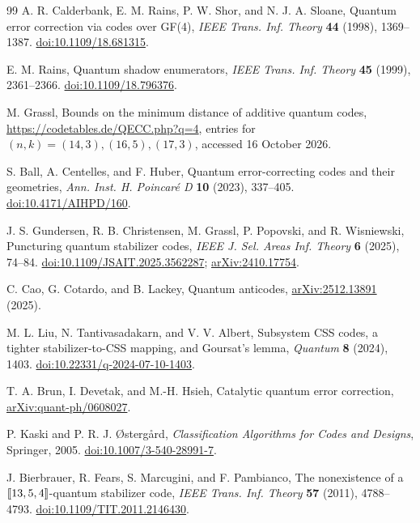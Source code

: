 \begin{thebibliography}{99}
A. R. Calderbank, E. M. Rains, P. W. Shor, and N. J. A. Sloane,
Quantum error correction via codes over GF(4),
\emph{IEEE Trans. Inf. Theory} \textbf{44} (1998), 1369--1387.
\href{https://doi.org/10.1109/18.681315}{doi:10.1109/18.681315}.

E. M. Rains, Quantum shadow enumerators,
\emph{IEEE Trans. Inf. Theory} \textbf{45} (1999), 2361--2366.
\href{https://doi.org/10.1109/18.796376}{doi:10.1109/18.796376}.

M. Grassl, Bounds on the minimum distance of additive quantum codes,
\url{https://codetables.de/QECC.php?q=4}, entries for
\((n,k)=(14,3),(16,5),(17,3)\), accessed 16 October 2026.

S. Ball, A. Centelles, and F. Huber,
Quantum error-correcting codes and their geometries,
\emph{Ann. Inst. H. Poincar\'e D} \textbf{10} (2023), 337--405.
\href{https://doi.org/10.4171/AIHPD/160}{doi:10.4171/AIHPD/160}.

J. S. Gundersen, R. B. Christensen, M. Grassl, P. Popovski, and
R. Wisniewski, Puncturing quantum stabilizer codes,
\emph{IEEE J. Sel. Areas Inf. Theory} \textbf{6} (2025), 74--84.
\href{https://doi.org/10.1109/JSAIT.2025.3562287}{doi:10.1109/JSAIT.2025.3562287};
\href{https://arxiv.org/abs/2410.17754}{arXiv:2410.17754}.

C. Cao, G. Cotardo, and B. Lackey, Quantum anticodes,
\href{https://arxiv.org/abs/2512.13891}{arXiv:2512.13891} (2025).

M. L. Liu, N. Tantivasadakarn, and V. V. Albert,
Subsystem CSS codes, a tighter stabilizer-to-CSS mapping, and Goursat's lemma,
\emph{Quantum} \textbf{8} (2024), 1403.
\href{https://doi.org/10.22331/q-2024-07-10-1403}{doi:10.22331/q-2024-07-10-1403}.

T. A. Brun, I. Devetak, and M.-H. Hsieh,
Catalytic quantum error correction,
\href{https://arxiv.org/abs/quant-ph/0608027}{arXiv:quant-ph/0608027}.

P. Kaski and P. R. J. \O{}sterg{\aa}rd,
\emph{Classification Algorithms for Codes and Designs},
Springer, 2005.
\href{https://doi.org/10.1007/3-540-28991-7}{doi:10.1007/3-540-28991-7}.

J. Bierbrauer, R. Fears, S. Marcugini, and F. Pambianco,
The nonexistence of a \([\![13,5,4]\!]\)-quantum stabilizer code,
\emph{IEEE Trans. Inf. Theory} \textbf{57} (2011), 4788--4793.
\href{https://doi.org/10.1109/TIT.2011.2146430}{doi:10.1109/TIT.2011.2146430}.


\end{thebibliography}
